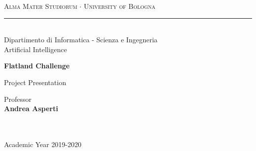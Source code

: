 \documentclass[11pt, a4paper, hidelinks]{report}
\begin{document}
\begin{titlepage}

\begin{center}
{{\Large{\textsc{Alma Mater Studiorum $\cdot$ University of Bologna}}}}
\rule[0.1cm]{15.8cm}{0.25mm}
\\\vspace{3mm}
%
%
{\Large{Dipartimento di Informatica - Scienza e Ingegneria\\
Artificial Intelligence}}


\end{center}

\vspace{20mm}

\begin{center}{
%
%
	{\LARGE{\textbf{Flatland Challenge}}}}
\end{center}

\vspace{15mm}

{\begin{center}
	 \large{Project Presentation}
\end{center}}

\vspace{32mm} \par \noindent

\begin{minipage}[t]{0.47\textwidth}
%
%
{\large{ Professor \vspace{2mm}\\{\textbf{Andrea Asperti}
}\\\\\\}}
\end{minipage}
%
\hfill
%
\begin{minipage}[t]{0.47\textwidth}
\end{minipage}

\vspace{31mm}

\begin{center}
Academic Year {2019-2020}
\end{center}

\end{titlepage}

{\tableofcontents}
\thispagestyle{empty}

\newpage
\setcounter{page}{1}
\end{document}
